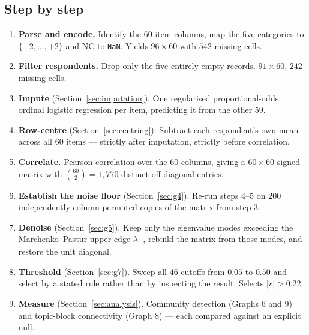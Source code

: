 \documentclass{article}
\begin{document}
\subsection{Step by step}
\label{sec:steps}

\begin{enumerate}\itemsep2pt \parskip0pt
\item \textbf{Parse and encode.} Identify the 60 item columns, map the five
categories to $\{-2,\dots,+2\}$ and NC to \texttt{NaN}. Yields $96\times60$
with $542$ missing cells.

\item \textbf{Filter respondents.} Drop only the five entirely empty records.
$91\times60$, $242$ missing cells.

\item \textbf{Impute} (Section~\ref{sec:imputation}). One regularised
proportional-odds ordinal logistic regression per item, predicting it from the
other 59.

\item \textbf{Row-centre} (Section~\ref{sec:centring}). Subtract each
respondent's own mean across all 60 items --- strictly after imputation,
strictly before correlation.

\item \textbf{Correlate.} Pearson correlation over the 60 columns, giving a
$60\times60$ signed matrix with $\binom{60}{2}=1{,}770$ distinct off-diagonal
entries.

\item \textbf{Establish the noise floor} (Section~\ref{sec:g4}). Re-run steps
4--5 on $200$ independently column-permuted copies of the matrix from step 3.

\item \textbf{Denoise} (Section~\ref{sec:g5}). Keep only the eigenvalue modes
exceeding the Marchenko--Pastur upper edge $\lambda_+$, rebuild the matrix from
those modes, and restore the unit diagonal.

\item \textbf{Threshold} (Section~\ref{sec:g7}). Sweep all $46$ cutoffs from
$0.05$ to $0.50$ and select by a stated rule rather than by inspecting the
result. Selects $|r|>0.22$.

\item \textbf{Measure} (Section~\ref{sec:analysis}). Community detection
(Graphs 6 and 9) and topic-block connectivity (Graph 8) --- each compared
against an explicit null.
\end{enumerate}
\end{document}
